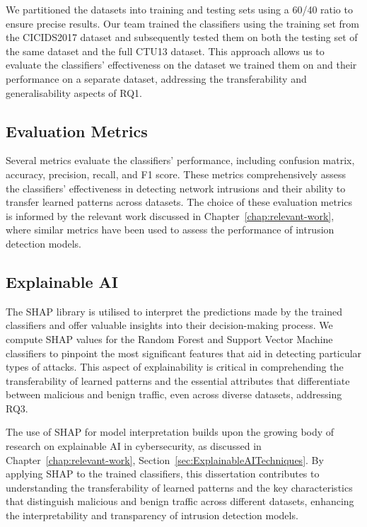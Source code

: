 We partitioned the datasets into training and testing sets using a 60/40 ratio to ensure precise results. Our team trained the classifiers using the training set from the CICIDS2017 dataset and subsequently tested them on both the testing set of the same dataset and the full CTU13 dataset. This approach allows us to evaluate the classifiers' effectiveness on the dataset we trained them on and their performance on a separate dataset, addressing the transferability and generalisability aspects of RQ1.

\subsection{Evaluation Metrics}\label{subsec:EvaluationMetrics}

Several metrics evaluate the classifiers' performance, including confusion matrix, accuracy, precision, recall, and F1 score. These metrics comprehensively assess the classifiers' effectiveness in detecting network intrusions and their ability to transfer learned patterns across datasets. The choice of these evaluation metrics is informed by the relevant work discussed in Chapter~\ref{chap:relevant-work}, where similar metrics have been used to assess the performance of intrusion detection models.

\subsection{Explainable AI}\label{subsec:ExplainableAI}

The SHAP library is utilised to interpret the predictions made by the trained classifiers and offer valuable insights into their decision-making process. We compute SHAP values for the Random Forest and Support Vector Machine classifiers to pinpoint the most significant features that aid in detecting particular types of attacks. This aspect of explainability is critical in comprehending the transferability of learned patterns and the essential attributes that differentiate between malicious and benign traffic, even across diverse datasets, addressing RQ3.

The use of SHAP for model interpretation builds upon the growing body of research on explainable AI in cybersecurity, as discussed in Chapter~\ref{chap:relevant-work}, Section~\ref{sec:ExplainableAITechniques}. By applying SHAP to the trained classifiers, this dissertation contributes to understanding the transferability of learned patterns and the key characteristics that distinguish malicious and benign traffic across different datasets, enhancing the interpretability and transparency of intrusion detection models.

